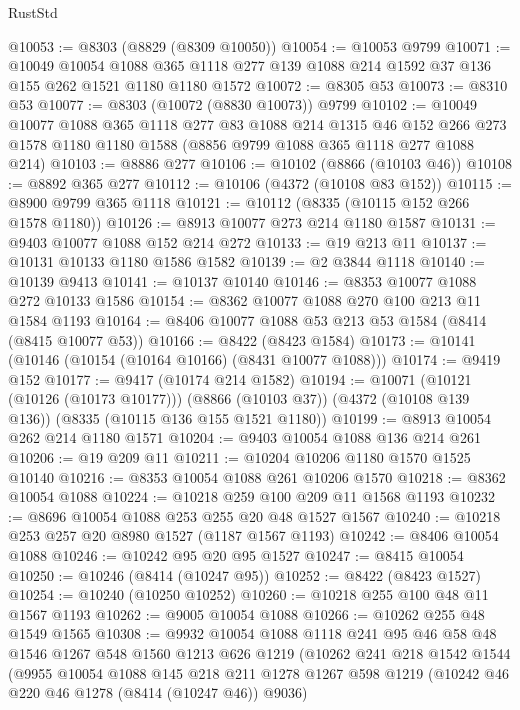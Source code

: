 \begin{lexlean}{RustStd}
\begin{coremodule}
@10053 := @8303 (@8829 (@8309 @10050))
@10054 := @10053 @9799
@10071 := @10049
    @10054
    @1088
    @365
    @1118
    @277
    @139
    @1088
    @214
    @1592
    @37
    @136
    @155
    @262
    @1521
    @1180
    @1180
    @1572
@10072 := @8305 @53
@10073 := @8310 @53
@10077 := @8303 (@10072 (@8830 @10073)) @9799
@10102 := @10049
    @10077
    @1088
    @365
    @1118
    @277
    @83
    @1088
    @214
    @1315
    @46
    @152
    @266
    @273
    @1578
    @1180
    @1180
    @1588
    (@8856 @9799 @1088 @365 @1118 @277 @1088 @214)
@10103 := @8886 @277
@10106 := @10102 (@8866 (@10103 @46))
@10108 := @8892 @365 @277
@10112 := @10106 (@4372 (@10108 @83 @152))
@10115 := @8900 @9799 @365 @1118
@10121 := @10112 (@8335 (@10115 @152 @266 @1578 @1180))
@10126 := @8913 @10077 @273 @214 @1180 @1587
@10131 := @9403 @10077 @1088 @152 @214 @272
@10133 := @19 @213 @11
@10137 := @10131 @10133 @1180 @1586 @1582
@10139 := @2 @3844 @1118
@10140 := @10139 @9413
@10141 := @10137 @10140
@10146 := @8353 @10077 @1088 @272 @10133 @1586
@10154 := @8362 @10077 @1088 @270 @100 @213 @11 @1584 @1193
@10164 := @8406 @10077 @1088 @53 @213 @53 @1584 (@8414 (@8415 @10077 @53))
@10166 := @8422 (@8423 @1584)
@10173 := @10141 (@10146 (@10154 (@10164 @10166) (@8431 @10077 @1088)))
@10174 := @9419 @152
@10177 := @9417 (@10174 @214 @1582)
@10194 := @10071
    (@10121 (@10126 (@10173 @10177)))
    (@8866 (@10103 @37))
    (@4372 (@10108 @139 @136))
    (@8335 (@10115 @136 @155 @1521 @1180))
@10199 := @8913 @10054 @262 @214 @1180 @1571
@10204 := @9403 @10054 @1088 @136 @214 @261
@10206 := @19 @209 @11
@10211 := @10204 @10206 @1180 @1570 @1525 @10140
@10216 := @8353 @10054 @1088 @261 @10206 @1570
@10218 := @8362 @10054 @1088
@10224 := @10218 @259 @100 @209 @11 @1568 @1193
@10232 := @8696 @10054 @1088 @253 @255 @20 @48 @1527 @1567
@10240 := @10218 @253 @257 @20 @8980 @1527 (@1187 @1567 @1193)
@10242 := @8406 @10054 @1088
@10246 := @10242 @95 @20 @95 @1527
@10247 := @8415 @10054
@10250 := @10246 (@8414 (@10247 @95))
@10252 := @8422 (@8423 @1527)
@10254 := @10240 (@10250 @10252)
@10260 := @10218 @255 @100 @48 @11 @1567 @1193
@10262 := @9005 @10054 @1088
@10266 := @10262 @255 @48 @1549 @1565
@10308 := @9932
    @10054
    @1088
    @1118
    @241
    @95
    @46
    @58
    @48
    @1546
    @1267
    @548
    @1560
    @1213
    @626
    @1219
    (@10262
      @241
      @218
      @1542
      @1544
      (@9955
        @10054
        @1088
        @145
        @218
        @211
        @1278
        @1267
        @598
        @1219
        (@10242 @46 @220 @46 @1278 (@8414 (@10247 @46)) @9036)

\end{coremodule}
\end{lexlean}
